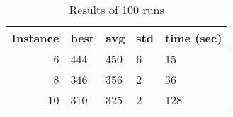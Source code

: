 \documentclass[12pt]{article}
\begin{document}
\begin{table}
\centering
\begin{tabular}{rllll} 
  \hline
  Instance & best & avg & std & time (sec) \\
  \hline \hline
  	6 & 444 & 450 & 6 & 15 \\
  \hline
	8 & 346 & 356 & 2 & 36 \\
  \hline
	10 & 310 & 325 & 2 & 128 \\
  \hline
\end{tabular}
\label{table:gammaSSE}
\caption{Results of 100 runs}
\end{table}
\end{document}
